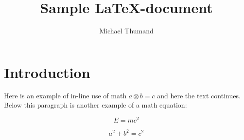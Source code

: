\documentclass{article}
\title{Sample \LaTeX -document}
\author{Michael Thumand}
\begin{document}
\maketitle

\section{Introduction}

Here is an example of in-line use of math $a\otimes b = c$ and here the text continues. Below this paragraph is another example of a math equation:

\begin{equation}
E=mc^2
\end{equation}

\begin{equation}
a^2 + b^2 = c^2
\end{equation}
\end{document}
